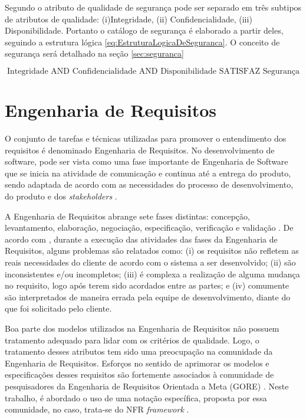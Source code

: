 Segundo \cite{chung2012non} o atributo de qualidade de segurança pode ser separado em três subtipos de atributos de qualidade: (i)Integridade, (ii) Confidencialidade, (iii) Disponibilidade. Portanto o catálogo de segurança é elaborado a partir deles, seguindo a estrutura lógica \ref{eq:EstruturaLogicaDeSeguranca}. O conceito de segurança será detalhado na seção \ref{sec:seguranca}

\begin{equation}
	\label{eq:EstruturaLogicaDeSeguranca}
	\textrm{Integridade AND Confidencialidade AND Disponibilidade SATISFAZ Segurança}
\end{equation}

\section{Engenharia de Requisitos}
\label{sec:requisitos}

O conjunto de tarefas e técnicas utilizadas para promover o entendimento dos requisitos é denominado Engenharia de Requisitos. No desenvolvimento de software, pode ser vista como uma fase importante de Engenharia de Software que se inicia na atividade de comunicação e continua até a entrega do produto, sendo adaptada de acordo com as necessidades do processo de desenvolvimento, do produto e dos \textit{stakeholders} \cite{pressman2011engenharia}.

A Engenharia de Requisitos abrange sete fases distintas: concepção, levantamento, elaboração, negociação, especificação, verificação e validação \cite{pressman2011engenharia}. De acordo com \cite{kotonya1998requirements}, durante a execução das atividades das fases da Engenharia de Requisitos, alguns problemas são relatados como: (i) os requisitos não refletem as reais necessidades do cliente de acordo com o sistema a ser desenvolvido; (ii) são inconsistentes e/ou incompletos; (iii) é complexa a realização de alguma mudança no requisito, logo após terem sido acordados entre as partes; e (iv) comumente são interpretados de maneira errada pela equipe de desenvolvimento, diante do que foi solicitado pelo cliente. 


Boa parte dos modelos utilizados na Engenharia de Requisitos não possuem tratamento adequado para lidar com os critérios de qualidade. Logo, o tratamento desses atributos tem sido uma preocupação na comunidade da Engenharia de Requisitos. Esforços no sentido de aprimorar os modelos e especificações desses requisitos são fortemente associados à comunidade de pesquisadores da Engenharia de Requisitos Orientada a Meta (GORE) \cite{chung2012non}. Neste trabalho, é abordado o uso de uma notação específica, proposta por essa comunidade, no caso, trata-se do NFR \textit{framework} \cite{chung2012non}. 

